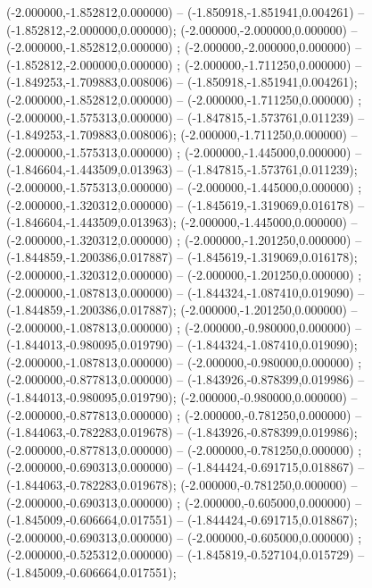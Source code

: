  (-2.000000,-1.852812,0.000000) -- (-1.850918,-1.851941,0.004261) -- (-1.852812,-2.000000,0.000000);
 (-2.000000,-2.000000,0.000000) -- (-2.000000,-1.852812,0.000000) ;
 (-2.000000,-2.000000,0.000000) -- (-1.852812,-2.000000,0.000000) ;
 (-2.000000,-1.711250,0.000000) -- (-1.849253,-1.709883,0.008006) -- (-1.850918,-1.851941,0.004261);
 (-2.000000,-1.852812,0.000000) -- (-2.000000,-1.711250,0.000000) ;
 (-2.000000,-1.575313,0.000000) -- (-1.847815,-1.573761,0.011239) -- (-1.849253,-1.709883,0.008006);
 (-2.000000,-1.711250,0.000000) -- (-2.000000,-1.575313,0.000000) ;
 (-2.000000,-1.445000,0.000000) -- (-1.846604,-1.443509,0.013963) -- (-1.847815,-1.573761,0.011239);
 (-2.000000,-1.575313,0.000000) -- (-2.000000,-1.445000,0.000000) ;
 (-2.000000,-1.320312,0.000000) -- (-1.845619,-1.319069,0.016178) -- (-1.846604,-1.443509,0.013963);
 (-2.000000,-1.445000,0.000000) -- (-2.000000,-1.320312,0.000000) ;
 (-2.000000,-1.201250,0.000000) -- (-1.844859,-1.200386,0.017887) -- (-1.845619,-1.319069,0.016178);
 (-2.000000,-1.320312,0.000000) -- (-2.000000,-1.201250,0.000000) ;
 (-2.000000,-1.087813,0.000000) -- (-1.844324,-1.087410,0.019090) -- (-1.844859,-1.200386,0.017887);
 (-2.000000,-1.201250,0.000000) -- (-2.000000,-1.087813,0.000000) ;
 (-2.000000,-0.980000,0.000000) -- (-1.844013,-0.980095,0.019790) -- (-1.844324,-1.087410,0.019090);
 (-2.000000,-1.087813,0.000000) -- (-2.000000,-0.980000,0.000000) ;
 (-2.000000,-0.877813,0.000000) -- (-1.843926,-0.878399,0.019986) -- (-1.844013,-0.980095,0.019790);
 (-2.000000,-0.980000,0.000000) -- (-2.000000,-0.877813,0.000000) ;
 (-2.000000,-0.781250,0.000000) -- (-1.844063,-0.782283,0.019678) -- (-1.843926,-0.878399,0.019986);
 (-2.000000,-0.877813,0.000000) -- (-2.000000,-0.781250,0.000000) ;
 (-2.000000,-0.690313,0.000000) -- (-1.844424,-0.691715,0.018867) -- (-1.844063,-0.782283,0.019678);
 (-2.000000,-0.781250,0.000000) -- (-2.000000,-0.690313,0.000000) ;
 (-2.000000,-0.605000,0.000000) -- (-1.845009,-0.606664,0.017551) -- (-1.844424,-0.691715,0.018867);
 (-2.000000,-0.690313,0.000000) -- (-2.000000,-0.605000,0.000000) ;
 (-2.000000,-0.525312,0.000000) -- (-1.845819,-0.527104,0.015729) -- (-1.845009,-0.606664,0.017551);

